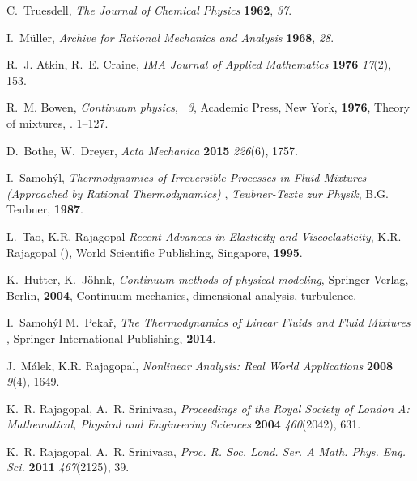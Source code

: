 \documentclass[a4paper]{article}
\begin{document}
\begin{thebibliography}{10}

C.~Truesdell, \textit{The Journal of Chemical Physics} \textbf{1962},
  \textit{37}.

I.~M\"{u}ller, \textit{Archive for Rational Mechanics and Analysis}
  \textbf{1968}, \textit{28}.

R.~J. Atkin, R.~E. Craine, \textit{IMA Journal of Applied Mathematics}
  \textbf{1976} \textit{17}(2), 153.

R.~M. Bowen, \textit{Continuum physics}, \textit{\bblvol{}~3}, Academic Press,
  New York, \textbf{1976}, \bblchapter{} Theory of mixtures, \bblpp{}. 1--127.

D.~Bothe, W.~Dreyer, \textit{Acta Mechanica} \textbf{2015} \textit{226}(6),
  1757.

I.~Samoh\'{y}l, \textit{Thermodynamics of Irreversible Processes in Fluid
  Mixtures (Approached by Rational Thermodynamics)} \textit{\bblfirsto{}
  \bbledn{}},  \bblof{} \textit{Teubner-Texte zur Physik}, B.G. Teubner,
  \textbf{1987}.

L.~Tao, K.R. Rajagopal \bblin{} \textit{Recent Advances in Elasticity and
  Viscoelasticity}, K.R. Rajagopal (\capitalize\bbled{}), World Scientific
  Publishing, Singapore, \textbf{1995}.

K.~Hutter, K.~J{\"o}hnk, \textit{Continuum methods of physical modeling},
  Springer-Verlag, Berlin, \textbf{2004}, Continuum mechanics, dimensional
  analysis, turbulence.

I.~Samoh\'{y}l M.~Peka\v{r}, \textit{The Thermodynamics of Linear Fluids and
  Fluid Mixtures} \textit{\bblfirsto{} \bbledn{}}, Springer International
  Publishing, \textbf{2014}.

J.~M\'{a}lek, K.R. Rajagopal, \textit{Nonlinear Analysis: Real World
  Applications} \textbf{2008} \textit{9}(4), 1649.

K.~R. Rajagopal, A.~R. Srinivasa, \textit{Proceedings of the Royal Society of
  London A: Mathematical, Physical and Engineering Sciences} \textbf{2004}
  \textit{460}(2042), 631.

K.~R. Rajagopal, A.~R. Srinivasa, \textit{Proc. R. Soc. Lond. Ser. A Math.
  Phys. Eng. Sci.} \textbf{2011} \textit{467}(2125), 39.


\end{thebibliography}
\end{document}
